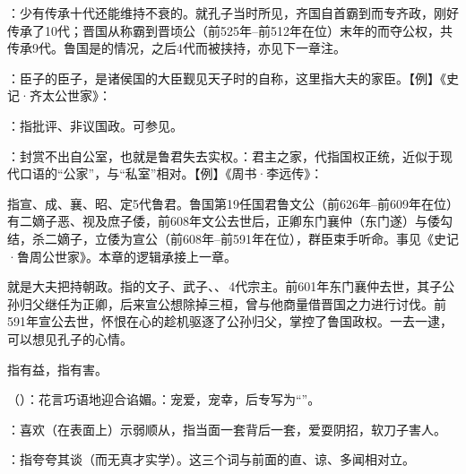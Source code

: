 {\item {}：少有传承十代还能维持不衰的。就孔子当时所见，齐国自首霸到而专齐政，刚好传承了10代；晋国从称霸到晋顷公（前525年--前512年在位）末年的而夺公权，共传承9代。鲁国是的情况，之后4代而被挟持，亦见下一章注。
\item {}：臣子的臣子，是诸侯国的大臣觐见天子时的自称，这里指大夫的家臣。【例】《史记·齐太公世家》：
\item {}：指批评、非议国政。可参见。
}
{}


{
\item {}：封赏不出自公室，也就是鲁君失去实权。：君主之家，代指国权正统，近似于现代口语的“公家”，与“私室”相对。【例】《周书·李远传》：

指宣、成、襄、昭、定5代鲁君。鲁国第19任国君鲁文公（前626年--前609年在位）有二嫡子恶、视及庶子倭，前608年文公去世后，正卿东门襄仲（东门遂）与倭勾结，杀二嫡子，立倭为宣公（前608年--前591年在位），群臣束手听命。事见《史记·鲁周公世家》。本章的逻辑承接上一章。

\item {}就是大夫把持朝政。指的文子、武子、、\,4代宗主。前601年东门襄仲去世，其子公孙归父继任为正卿，后来宣公想除掉三桓，曾与他商量借晋国之力进行讨伐。前591年宣公去世，怀恨在心的趁机驱逐了公孙归父，掌控了鲁国政权。一去一逮，可以想见孔子的心情。
}
{}


{
\item {}指有益，指有害。
\item {}（）：花言巧语地迎合谄媚。：宠爱，宠幸，后专写为“”。
\item {}：喜欢（在表面上）示弱顺从，指当面一套背后一套，爱耍阴招，软刀子害人。
\item {}：指夸夸其谈（而无真才实学）。这三个词与前面的直、谅、多闻相对立。
}
{}


